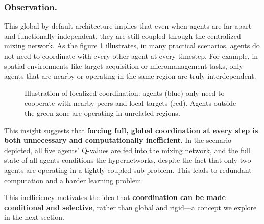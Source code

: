 \documentclass[../Main.tex]{subfiles}
\begin{document}
\subsubsection{Observation.}

This global-by-default architecture implies that even when agents are far apart and functionally independent, they are still coupled through the centralized mixing network. As the figure \ref{fig:local-coordination} illustrates, in many practical scenarios, agents do not need to coordinate with every other agent at every timestep. For example, in spatial environments like target acquisition or micromanagement tasks, only agents that are nearby or operating in the same region are truly interdependent.

\begin{figure}[H]
    \centering
    \caption{Illustration of localized coordination: agents (blue) only need to cooperate with nearby peers and local targets (red). Agents outside the green zone are operating in unrelated regions.}
    \label{fig:local-coordination}
\end{figure}

This insight suggests that \textbf{forcing full, global coordination at every step is both unnecessary and computationally inefficient}. In the scenario depicted, all five agents' Q-values are fed into the mixing network, and the full state of all agents conditions the hypernetworks, despite the fact that only two agents are operating in a tightly coupled sub-problem. This leads to redundant computation and a harder learning problem.

This inefficiency motivates the idea that \textbf{coordination can be made conditional and selective}, rather than global and rigid—a concept we explore in the next section.
\end{document}
